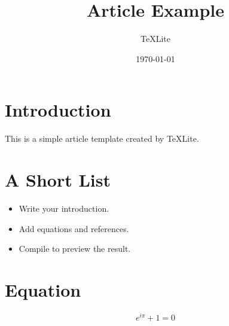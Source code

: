 \documentclass[12pt]{article}
\title{Article Example}
\author{TeXLite}
\date{\today}
\begin{document}
\maketitle

\section{Introduction}
This is a simple article template created by TeXLite.

\section{A Short List}
\begin{itemize}
    \item Write your introduction.
    \item Add equations and references.
    \item Compile to preview the result.
\end{itemize}

\section{Equation}
\begin{equation}
    e^{i\pi} + 1 = 0
\end{equation}
\end{document}
